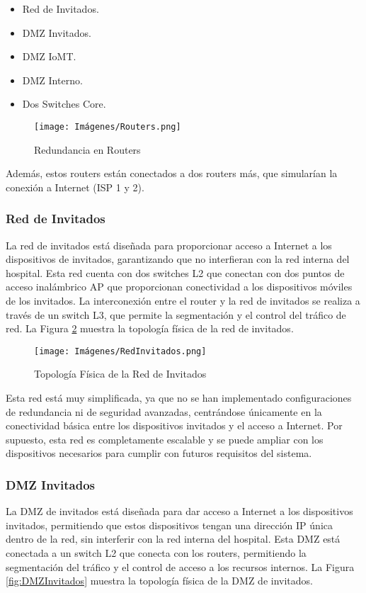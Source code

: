 \begin{itemize}
    \item Red de Invitados.
    \item DMZ Invitados.
    \item DMZ IoMT.
    \item DMZ Interno.
    \item Dos Switches Core.
\end{itemize}

\begin{figure}[H]
    \centering
    \texttt{[image: Imágenes/Routers.png]}
    \caption{Redundancia en Routers}
    \label{fig:Routers} 
\end{figure}

Además, estos routers están conectados a dos routers más, que simularían la conexión a Internet (\ac{ISP} 1 y 2).

\subsubsection{Red de Invitados}
La red de invitados está diseñada para proporcionar acceso a Internet a los dispositivos de invitados, garantizando que no interfieran con la red interna del hospital. Esta red 
cuenta con dos switches L2 que conectan con dos puntos de acceso inalámbrico \ac{AP} que proporcionan conectividad a los dispositivos móviles de los invitados. La interconexión entre 
el router y la red de invitados se realiza a través de un switch L3, que permite la segmentación y el control del tráfico de red. La Figura \ref{fig:RedInvitados} muestra la topología 
física de la red de invitados.
\begin{figure}[H]
    \centering
    \texttt{[image: Imágenes/RedInvitados.png]}
    \caption{Topología Física de la Red de Invitados}
    \label{fig:RedInvitados}
\end{figure}

Esta red está muy simplificada, ya que no se han implementado configuraciones de redundancia ni de seguridad avanzadas, centrándose únicamente en la conectividad básica entre los dispositivos 
invitados y el acceso a Internet. Por supuesto, esta red es completamente escalable y se puede ampliar con los dispositivos necesarios para cumplir con futuros requisitos del sistema.

\subsubsection{DMZ Invitados}
La DMZ de invitados está diseñada para dar acceso a Internet a los dispositivos invitados, permitiendo que estos dispositivos tengan una dirección IP única dentro de la red, sin 
interferir con la red interna del hospital. Esta DMZ está conectada a un switch L2 que conecta con los routers, permitiendo la segmentación del tráfico y el control de acceso a los recursos 
internos. La Figura \ref{fig:DMZInvitados} muestra la topología física de la DMZ de invitados.

